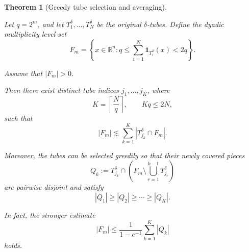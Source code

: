 \documentclass[11pt, letterpaper]{nyjm}
\newtheorem{theorem}{Theorem}[section]
\begin{document}
	\begin{theorem}[Greedy tube selection and averaging]
		\label{thm:greedy-selection}
		
		Let $q=2^m$, and let
		$T_1^\delta,\ldots,T_N^\delta$ be the original
		$\delta$-tubes. Define the dyadic multiplicity
		level set
		\[
		F_m=
		\left\{
		x\in\mathbb R^n:
		q\leq\sum_{i=1}^N
		\mathbf{1}_{T_i^\delta}(x)<2q
		\right\}.
		\]
		
		Assume that $|F_m|>0$.
		
		Then there exist distinct tube indices
		$j_1,\ldots,j_K$, where
		\[
		K=\left\lceil\frac Nq\right\rceil,
		\qquad Kq\leq 2N,
		\]
		such that
		\[
		\boxed{
			|F_m|\lesssim
			\sum_{k=1}^K
			|T_{j_k}^\delta\cap F_m|.
		}
		\]
		
		Moreover, the tubes can be selected greedily
		so that their newly covered pieces
		\[
		Q_k:=
		T_{j_k}^\delta\cap
		\left(
		F_m\setminus
		\bigcup_{r=1}^{k-1}T_{j_r}^\delta
		\right)
		\]
		are pairwise disjoint and satisfy
		\[
		|Q_1|\geq |Q_2|\geq\cdots\geq |Q_K|.
		\]
		
		In fact, the stronger estimate
		\[
		\boxed{
			|F_m|\leq
			\frac{1}{1-e^{-1}}
			\sum_{k=1}^K|Q_k|
		}
		\]
		holds.
		
	\end{theorem}
	
\end{document}
